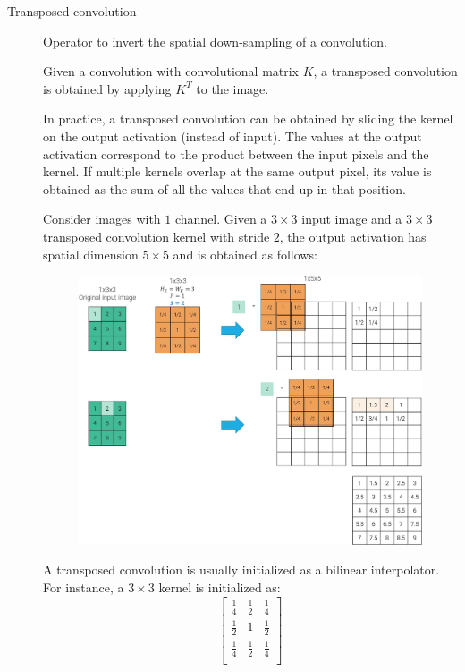 \begin{description}
    \item[Transposed convolution] 
        Operator to invert the spatial down-sampling of a convolution.

        Given a convolution with convolutional matrix $K$, a transposed convolution is obtained by applying $K^T$ to the image.

        In practice, a transposed convolution can be obtained by sliding the kernel on the output activation (instead of input). The values at the output activation correspond to the product between the input pixels and the kernel. If multiple kernels overlap at the same output pixel, its value is obtained as the sum of all the values that end up in that position.

        \begin{example}
            Consider images with $1$ channel. Given a $3 \times 3$ input image and a $3 \times 3$ transposed convolution kernel with stride $2$, the output activation has spatial dimension $5 \times 5$ and is obtained as follows:
            \begin{figure}[H]
                \centering
                \includegraphics[width=0.9\linewidth]{./img/_transposed_convolution.jpg}
            \end{figure}
        \end{example}

        \begin{remark}
            A transposed convolution is usually initialized as a bilinear interpolator. For instance, a $3 \times 3$ kernel is initialized as:
            \[ 
                \begin{bmatrix}
                    \frac{1}{4} & \frac{1}{2} & \frac{1}{4} \\
                    \frac{1}{2} & 1 & \frac{1}{2} \\
                    \frac{1}{4} & \frac{1}{2} & \frac{1}{4} \\
                \end{bmatrix}
            \]
        \end{remark}


\end{description}
